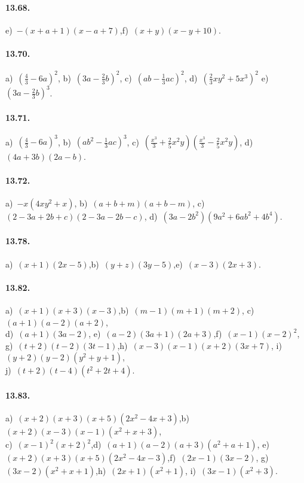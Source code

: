 \paragraph{13.68.}
e)~$-(x+a+1)(x-a+7)$,\quad f)~$(x+y)(x-y+10)$.

\paragraph{13.70.}
a)~$\left(\frac{4}{3}-6a\right)^2$, \quad b)~$\left(3a-\frac{2}{3}b\right)^{2}$, \quad c)~$\left(ab-\frac{1}{3}ac\right)^{2}$, \quad d)~$\left(\frac{2}{3}xy^{2}+5x^{3}\right)^2$ \quad e)~$\left(3a-\frac{2}{3}b\right)^{3}$.

\paragraph{13.71.}
a)~$\left(\frac{4}{3}-6a\right)^3$, \; b)~$\left(ab^{2}-\frac{1}{3}ac\right)^{3}$, \; c)~$\left(\frac{x^{3}}{3}+\frac{2}{5}x^{2}y\right)\left(\frac{x^{3}}{3}-\frac{2}{5}x^{2}y\right)$, \; d)~$(4a+3b)(2a-b)$.

\paragraph{13.72.}
a)~$-x\left(4xy^{2}+x\right)$, \quad b)~$(a+b+m)(a+b-m)$, \quad c)~$(2-3a+2b+c)(2-3a-2b-c)$, \quad d)~$\left(3a-2b^{2}\right)\left(9a^{2}+6ab^{2}+4b^{4}\right)$.

\paragraph{13.78.} a)~$(x+1)(2x-5)$,\quad b)~$(y+z)(3y-5)$,\quad e)~$(x-3)\left(2x+3\right)$.

\paragraph{13.82.} a)~$(x+1)(x+3)\left(x-3\right)$,\quad b)~$(m-1)(m+1)\left(m+2\right)$,\quad
c)~$(a+1)(a-2)\left(a+2\right)$,\quad \protect\\
d)~$(a+1)\left(3a-2\right)$,\quad
e)~$(a-2)(3a+1)\left(2a+3\right)$,\quad f)~$(x-1)(x-2)^{2}$,\quad
g)~$(t+2)(t-2)\left(3t-1\right)$,\quad h)~$(x-3)(x-1)(x+2)(3x+7)$,\quad
i)~$(y+2)(y-2)\left(y^{2}+y+1\right)$,\quad
\protect\\j)~$(t+2)(t-4)\left(t^{2}+2t+4\right)$.

\paragraph{13.83.} a)~$(x+2)(x+3)(x+5)\left(2x^{2}-4x+3\right)$,\quad b)~$(x+2)(x-3)(x-1)\left(x^{2}+x+3\right)$,\quad
\protect\\ c)~$(x-1)^{2}\left(x+2\right)^{2}$,\quad d)~$(a+1)(a-2)(a+3)(a^{2}+a+1)$,\quad
e)~$(x+2)(x+3)(x+5)(2x^{2}-4x-3)$,\quad f)~$(2x-1)(3x-2)$,\quad
g)~$(3x-2)\left(x^{2}+x+1\right)$,\quad h)~$(2x+1)\left(x^{2}+1\right)$,\quad
i)~$(3x-1)\left(x^{2}+3\right)$.

